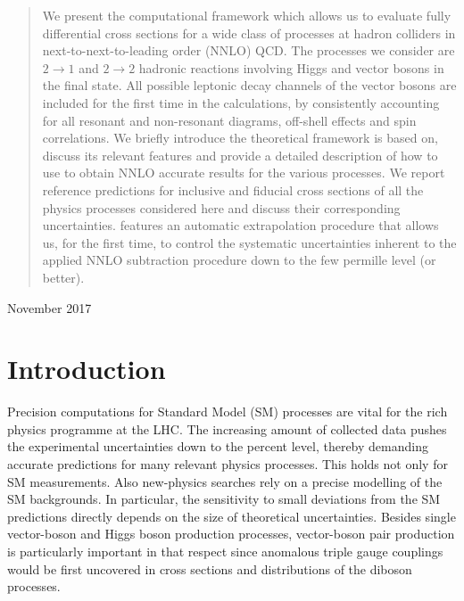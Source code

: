 \documentclass[english,11pt]{article}
\begin{document}
\begin{titlepage}
\begin{quote}
We present the computational framework \Matrix{} \cite{MATRIX} which allows us to evaluate
fully differential cross sections for a wide class of processes at hadron colliders in
next-to-next-to-leading order (NNLO) QCD. The processes we consider are $2\to 1$
and $2\to 2$ hadronic reactions involving Higgs and vector bosons in the final state.
All possible leptonic decay channels of the vector bosons are included for the first time in the calculations,
by consistently accounting for all resonant and non-resonant diagrams, off-shell effects and spin correlations.
We briefly introduce the theoretical framework \Matrix{} is based on, discuss its relevant
features and provide a detailed description of how to use \Matrix{} to obtain NNLO accurate results for the various processes.
We report reference predictions for inclusive and fiducial cross sections of all the
physics processes considered here and discuss their corresponding uncertainties.
\Matrix{} features an automatic extrapolation procedure that allows us, for the first time,
to control the systematic uncertainties inherent to the applied
NNLO subtraction procedure down to the few permille level (or better).

\end{quote}

\vspace*{\fill}
\begin{flushleft}
November 2017

\end{flushleft}
\end{titlepage}

\tableofcontents

\section{Introduction}

Precision computations for Standard Model (SM) processes are vital for the rich physics programme at the LHC. The increasing 
amount of collected data pushes the experimental uncertainties down to the percent level, thereby demanding accurate predictions for
many relevant physics processes. This holds not only for SM measurements. Also new-physics  searches rely on a precise modelling 
of the SM backgrounds. In particular, the sensitivity to small deviations from the SM predictions directly depends on the size of
theoretical uncertainties. Besides single vector-boson and Higgs boson production processes, vector-boson pair production 
is particularly important in that respect since anomalous 
triple gauge couplings would be first uncovered
in cross sections and distributions of the diboson processes.
\end{document}
